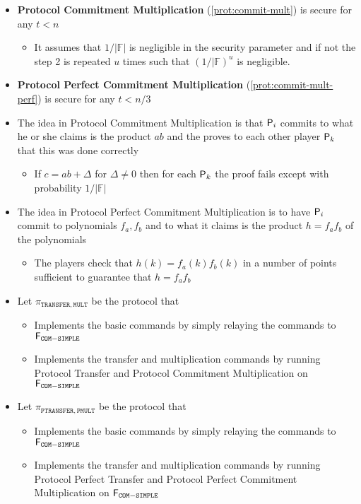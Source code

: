 \begin{itemize}
  \item \textbf{Protocol Commitment Multiplication} (\autoref{prot:commit-mult}) is secure for any $t < n$
  \begin{itemize}
  	\item It assumes that $1/|\mathbb{F}|$ is negligible in the security parameter and if not the step 2 is repeated $u$ times such that $(1/|\mathbb{F})^u$ is negligible.
  \end{itemize}
  \item \textbf{Protocol Perfect Commitment Multiplication} (\autoref{prot:commit-mult-perf}) is secure for any $t < n/3$
  \item The idea in Protocol Commitment Multiplication is that $\P_i$ commits to what he or she claims is the product $ab$ and the proves to each other player $\P_k$ that this was done correctly
  \begin{itemize}
  	\item If $c = ab + \Delta$ for $\Delta \neq 0$ then for each $\P_k$ the proof fails except with probability $1/|\mathbb F|$
  \end{itemize}

  \item The idea in Protocol Perfect Commitment Multiplication is to have $\P_i$ commit to polynomials $f_a,f_b$ and to what it claims is the product $h=f_af_b$ of the polynomials
  \begin{itemize}
  	\item The players check that $h(k) = f_a(k)f_b(k)$ in a number of points sufficient to guarantee that $h=f_af_b$
  \end{itemize}

  \item Let $\pi_{\mathtt{TRANSFER},\mathtt{MULT}}$ be the protocol that
  \begin{itemize}
  	\item Implements the basic commands by simply relaying the commands to $\F_{\mathtt{COM-SIMPLE}}$
  	\item Implements the transfer and multiplication commands by running Protocol Transfer and Protocol Commitment Multiplication on $\F_{\mathtt{COM-SIMPLE}}$
  \end{itemize}

  \item Let $\pi_{\mathtt{PTRANSFER},\mathtt{PMULT}}$ be the protocol that
  \begin{itemize}
  	\item Implements the basic commands by simply relaying the commands to $\F_{\mathtt{COM-SIMPLE}}$
  	\item Implements the transfer and multiplication commands by running Protocol Perfect Transfer and Protocol Perfect Commitment Multiplication on $\F_{\mathtt{COM-SIMPLE}}$
  \end{itemize}
\end{itemize}
